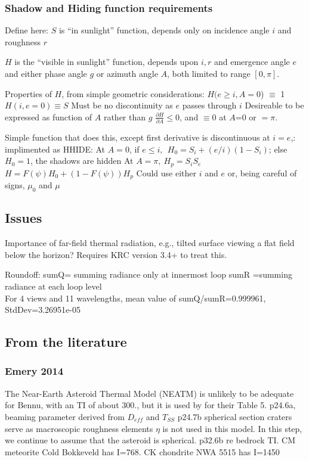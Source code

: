 \documentclass{article}
\begin{document}
\subsubsection{Shadow and Hiding function requirements}  %

 Define here: $S$ is  ``in sunlight'' function, depends only on incidence angle $i$ and roughness $r$

$H$ is the ``visible in sunlight'' function, depends upon $i,r$ and emergence
 angle $e$ and either phase angle $g$ or azimuth angle $A$, both limited to range $[0,\pi]$.

Properties of $H$, from simple geometric considerations:
\qi $H( e \geq i,A=0$)  $\equiv $ 1
\qi $H (i, e=0) \equiv  S$ 
\qi Must be no discontinuity as $e$ passes through $i$
\qi Desireable to be expressed as function of $A$ rather than  $g$
\qi $\frac{\partial H}{\partial A} \leq 0$, and $\equiv 0$ at $A$=0 or $=\pi$.


Simple function that does this, except first derivative is discontinuous at $i=e$,: implimented as HHIDE: 
\qi At $A=0$, if $e \leq i, \ \  H_0=S_i+(e/i)(1-S_i)$; else $H_0=1$, the shadows are hidden
\qi At $A=\pi, \ H_p=S_iS_e$
\\ $H=F(\psi)H_0 +  \left( 1-F(\psi) \right) H_p$
\qi Could use either $i$ and $e$ or, being careful of signs, $\mu_0$ and $\mu$

\subsection{Issues}  %
Importance of far-field thermal radiation, e.g., tilted surface viewing a flat
field below the horizon? Requires KRC version 3.4+ to treat this.

 Roundoff:
\qi sumQ= summing radiance only at innermost loop 
\qi sumR =summing radiance at each loop level
\\ For 4 views and 11 wavelengths, mean value of sumQ/sumR=0.999961, StdDev=3.26951e-05

\subsection{From the literature}

\subsubsection{Emery 2014}
The Near-Earth Asteroid Thermal Model (NEATM)  is unlikely to be
adequate for Bennu, with an TI of about 300., but it is used by 
for their Table 5.
\qi p24.6a, beaming parameter derived from $D_{eff}$ and $T_{SS}$
\qi p24.7b spherical section craters serve as macroscopic roughness elements 
\qi $\eta$ is not used in this model. In this step, we continue to assume that the
asteroid is spherical.
\qi p32.6b re bedrock TI. CM meteorite Cold Bokkeveld has I=768. CK chondrite NWA 5515 has I=1450 
\end{document}
